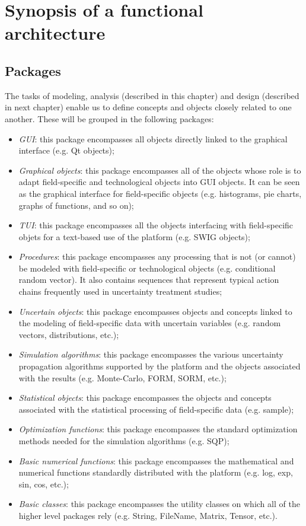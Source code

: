 \section{Synopsis of a functional architecture}

\subsection{Packages}

The tasks of modeling, analysis (described in this chapter) and design (described in next chapter) enable us to define concepts and objects closely related to one another. These will be grouped in the following packages:
\begin{itemize}
\item \emph{GUI}: this package encompasses all objects directly linked to the graphical interface (e.g. Qt objects);
\item \emph{Graphical objects}: this package encompasses all of the objects whose role is to adapt field-specific and technological objects into GUI objects. It can be seen as the graphical interface for field-specific objects (e.g. histograms, pie charts, graphs of functions, and so on);
\item \emph{TUI}: this package encompasses all the objects interfacing with field-specific objets for a text-based use of the platform (e.g. SWIG objects);
\item \emph{Procedures}: this package encompasses any processing that is not (or cannot) be modeled with field-specific or technological objects (e.g. conditional random vector). It also contains sequences that represent typical action chains frequently used in uncertainty treatment studies;
\item \emph{Uncertain objects}: this package encompasses objects and concepts linked to the modeling of field-specific data with uncertain variables (e.g. random vectors, distributions, etc.);
\item \emph{Simulation algorithms}: this package encompasses the various uncertainty propagation algorithms supported by the platform and the objects associated with the results (e.g. Monte-Carlo, FORM, SORM, etc.);
\item \emph{Statistical objects}: this package encompasses the objects and concepts associated with the statistical processing of field-specific data (e.g. sample);
\item \emph{Optimization functions}: this package encompasses the standard optimization methods needed for the simulation algorithms (e.g. SQP);
\item \emph{Basic numerical functions}: this package encompasses the mathematical and numerical functions standardly distributed with the platform (e.g. log, exp, sin, cos, etc.);
\item \emph{Basic classes}: this package encompasses the utility classes on which all of the higher level packages rely (e.g. String, FileName, Matrix, Tensor, etc.).
\end{itemize}

